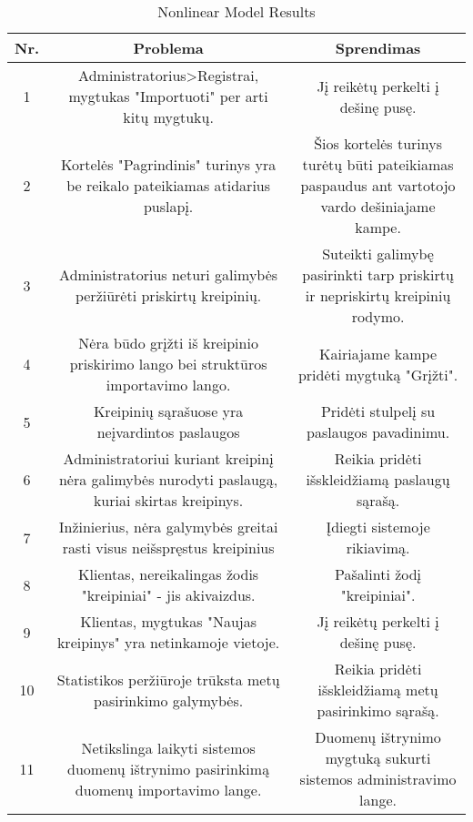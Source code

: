 		\begin{table}[ht] 
		\caption{Nonlinear Model Results} %
		\centering %
			\begin{tabular}{c c c} %
		\hline\hline %
		Nr. & Problema & Sprendimas\\ [0.5ex] %
		\hline %
		1 & Administratorius>Registrai, mygtukas "Importuoti" per arti kitų mygtukų. & Jį reikėtų perkelti į dešinę pusę.\\ %
		2 & Kortelės "Pagrindinis" turinys yra be reikalo pateikiamas atidarius puslapį. & Šios kortelės turinys turėtų būti pateikiamas paspaudus ant vartotojo vardo dešiniajame kampe.\\%
		3 & Administratorius neturi galimybės peržiūrėti priskirtų kreipinių. & Suteikti galimybę pasirinkti tarp priskirtų ir nepriskirtų kreipinių rodymo.\\ %
		4 & Nėra būdo grįžti iš kreipinio priskirimo lango bei struktūros importavimo lango. & Kairiajame kampe pridėti mygtuką "Grįžti".\\ %
		5 & Kreipinių sąrašuose yra neįvardintos paslaugos & Pridėti stulpelį su paslaugos pavadinimu.\\%
		6 & Administratoriui kuriant kreipinį nėra galimybės nurodyti paslaugą, kuriai skirtas kreipinys. & Reikia pridėti išskleidžiamą paslaugų sąrašą.\\%
		7 & Inžinierius, nėra galymybės greitai rasti visus neišspręstus kreipinius & Įdiegti sistemoje rikiavimą.\\ %
		8 & Klientas, nereikalingas žodis "kreipiniai" - jis akivaizdus. & Pašalinti žodį "kreipiniai".\\%
		9 & Klientas, mygtukas "Naujas kreipinys" yra netinkamoje vietoje. & Jį reikėtų perkelti į dešinę pusę.\\%
		10 & Statistikos peržiūroje trūksta metų pasirinkimo galymybės. & Reikia pridėti išskleidžiamą metų pasirinkimo sąrašą.\\ %
		11 & Netikslinga laikyti sistemos duomenų ištrynimo pasirinkimą duomenų importavimo lange. & Duomenų ištrynimo mygtuką sukurti sistemos administravimo lange.\\%
		\hline %
		\end{tabular} 
		\label{table:nonlin} %
		\end{table} 
	
